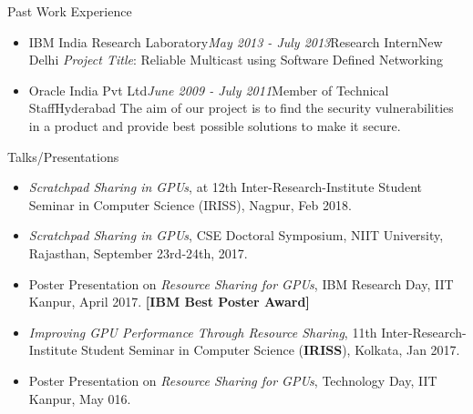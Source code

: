 \documentclass{resume} %
\begin{document}
\begin{rSection}{Past Work Experience}
\begin{itemize}

\item \begin{rSubsection}{IBM India Research Laboratory}{\textit{May 2013 - July 2013}}{Research Intern}{New Delhi}
\textit{Project Title}: Reliable Multicast using Software Defined Networking 
\end{rSubsection}




\item \begin{rSubsection}{Oracle India Pvt Ltd}{\textit{June 2009 - July 2011}}{Member of Technical Staff}{Hyderabad}
The aim of our project is to find the security vulnerabilities in a product and provide best possible solutions to make it secure.
\end{rSubsection}


\end{itemize}
\end{rSection}



\begin{rSection}{Talks/Presentations}
\begin{itemize}
\item \textit{Scratchpad Sharing in GPUs}, at 12th Inter-Research-Institute Student Seminar in Computer Science (IRISS), Nagpur, Feb 2018. 
\item \textit{Scratchpad Sharing in GPUs}, CSE Doctoral Symposium, NIIT University, Rajasthan, September 23rd-24th, 2017.
\item Poster Presentation on \textit{Resource Sharing for GPUs}, IBM Research Day, IIT Kanpur, April 2017. \textbf{[IBM Best Poster Award]} 
\item \textit{Improving GPU Performance Through Resource Sharing}, 11th Inter-Research-Institute Student Seminar in Computer Science (\textbf{IRISS}), Kolkata, Jan 2017.
\item Poster Presentation on \textit{Resource Sharing for GPUs}, Technology Day, IIT Kanpur, May 016. 

\end{itemize}
\end{rSection}
\end{document}
